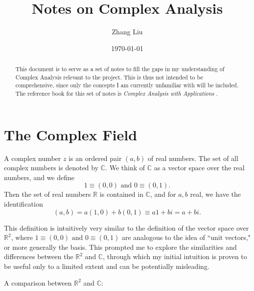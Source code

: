 \documentclass[11pt,reqno,oneside,a4paper]{article}
\author{Zhang Liu}
\title{Notes on Complex Analysis}
\date{\today}
\begin{document}
\maketitle
\thispagestyle{fancy}

\begin{abstract}
    This document is to serve as a set of notes to fill the gaps in my understanding of Complex Analysis relevant to the project. This is thus not intended to be comprehensive, since only the concepts I am currently unfamiliar with will be included. The reference book for this set of notes is \textit{Complex Analysis with Applications} \cite{AG2010a}.
\end{abstract}


\section{The Complex Field} \label{sec:ComplexField}

\begin{defn}
	A complex number $z$ is an ordered pair $(a,b)$ of real numbers. The set of all complex numbers is denoted by $\mathbb{C}$. We think of $\mathbb{C}$ as a vector space over the real numbers, and we define 
	$$1 \equiv (0,0) \text{ and } 0 \equiv (0,1).$$
	Then the set of real numbers $\mathbb{R}$ is contained in $\mathbb{C}$, and for $a,b$ real, we have the identification
	$$(a,b) = a(1,0) + b(0,1) \equiv a1+bi = a + bi.$$
\end{defn}

\par This definition is intuitively very similar to the definition of the vector space over $\mathbb{R}^2$, where $1 \equiv (0,0) \text{ and } 0 \equiv (0,1)$ are analogous to the idea of ``unit vectors," or more generally the basis. This prompted me to explore the similarities and differences between the $\mathbb{R}^2$ and $\mathbb{C}$, through which my initial intuition is proven to be useful only to a limited extent and can be potentially misleading. 

A comparison between $\mathbb{R}^2$ and $\mathbb{C}$:
\end{document}
